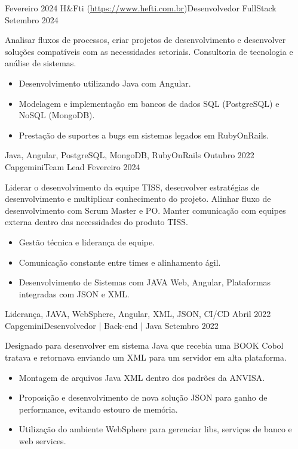 \begin{experiences}
        {Fevereiro 2024} {H\&Fti (\url{https://www.hefti.com.br})}{Desenvolvedor FullStack}{}
        {Setembro 2024} { Analisar fluxos de processos, criar projetos de desenvolvimento e desenvolver soluções compatíveis com as necessidades setoriais. Consultoria de tecnologia e análise de sistemas.
            \begin{itemize}
               \item Desenvolvimento utilizando Java com Angular.
               \item Modelagem e implementação em bancos de dados SQL (PostgreSQL) e NoSQL (MongoDB).
               \item Prestação de suportes a bugs em sistemas legados em RubyOnRails.
              \end{itemize}
            }
            {Java, Angular, PostgreSQL, MongoDB, RubyOnRails}
    \emptySeparator
    \experience
        {Outubro 2022} {Capgemini}{Team Lead}{}
        {Fevereiro 2024} { Liderar o desenvolvimento da equipe TISS, desenvolver estratégias de desenvolvimento e multiplicar conhecimento do projeto. Alinhar fluxo de desenvolvimento com Scrum Master e PO. Manter comunicação com equipes externa dentro das necessidades do produto TISS.
            \begin{itemize}
               \item Gestão técnica e liderança de equipe.
               \item Comunicação constante entre times e alinhamento ágil.
               \item Desenvolvimento de Sistemas com JAVA Web, Angular, Plataformas integradas com JSON e XML.
              \end{itemize}
            }
            {Liderança, JAVA, WebSphere, Angular, XML, JSON, CI/CD}
    \emptySeparator
    \experience
        {Abril 2022}   {Capgemini}{Desenvolvedor | Back-end | Java}{}
        {Setembro 2022} { Designado para desenvolver em sistema Java que recebia uma BOOK Cobol tratava e retornava enviando um XML para um servidor em alta plataforma.
            \begin{itemize}
                \item Montagem de arquivos Java XML dentro dos padrões da ANVISA.
                \item Proposição e desenvolvimento de nova solução JSON para ganho de performance, evitando estouro de memória.
                \item Utilização do ambiente WebSphere para gerenciar libs, serviços de banco e web services.

\end{itemize}}
\end{experiences}
